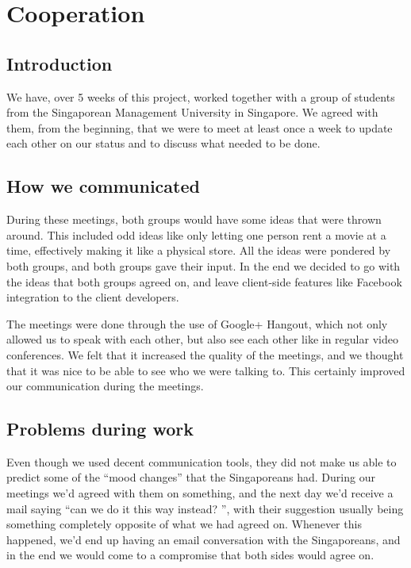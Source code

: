 \chapter{Cooperation}
\section{Introduction}
\label{Cooperation_introduction}
We have, over 5 weeks of this project, worked together with a group of students from the Singaporean Management University in Singapore. We agreed with them, from the beginning, that we were to meet at least once a week to update each other on our status and to discuss what needed to be done.

\section{How we communicated}
\label{Cooperation_communicated}
During these meetings, both groups would have some ideas that were thrown around. This included odd ideas like only letting one person rent a movie at a time, effectively making it like a physical store. All the ideas were pondered by both groups, and both groups gave their input. In the end we decided to go with the ideas that both groups agreed on, and leave client-side features like Facebook integration to the client developers.

The meetings were done through the use of Google+ Hangout, which not only allowed us to speak with each other, but also see each other like in regular video conferences. We felt that it increased the quality of the meetings, and we thought that it was nice to be able to see who we were talking to. This certainly improved our communication during the meetings.

\section{Problems during work}
\label{Cooperation_problems}
Even though we used decent communication tools, they did not make us able to predict some of the ``mood changes'' that the Singaporeans had. During our meetings we'd agreed with them on something, and the next day we'd receive a mail saying ``can we do it this way instead? '', with their suggestion usually being something completely opposite of what we had agreed on. Whenever this happened, we'd end up having an email conversation with the Singaporeans, and in the end we would come to a compromise that both sides would agree on.

